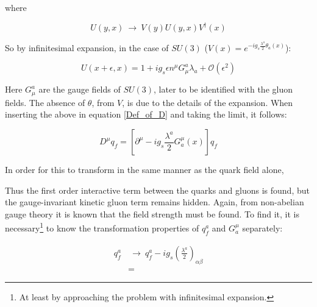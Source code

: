 \documentclass[11pt,a4paper]{article}
\begin{document}
where

\begin{equation}
	U(y,x) \:\rightarrow\: V(y)U(y,x)V^\dagger(x)
\end{equation}

So by infinitesimal expansion, in the case of $SU(3)$ ($V(x) = e^{-ig_s\frac{\lambda^a}{2}\theta_a(x)}$):

\begin{equation}
	U(x+\epsilon, x) = 1 + ig_s\epsilon n^\mu G_\mu^a \lambda_a + \mathcal{O}(\epsilon^2)
\end{equation}

Here $G_\mu^a$ are the gauge fields of $SU(3)$, later to be identified with the gluon fields. The absence of $\theta$, from $V$, is due to the details of the expansion. When inserting the above in equation \ref{Def_of_D} and taking the limit, it follows:

\begin{equation}
	D^\mu q_f = \left[ \partial^\mu - ig_s\frac{\lambda^a}{2}G_a^\mu(x) \right]q_f
\end{equation}

In order for this to transform in the same manner as the quark field alone,

Thus the first order interactive term between the quarks and gluons is found, but the gauge-invariant kinetic gluon term remains hidden. Again, from non-abelian gauge theory it is known that the field strength must be found. To find it, it is necessary\footnote{At least by approaching the problem with infinitesimal expansion.} to know the transformation properties of $q_f^a$ and $G_a^\mu$ separately:

\begin{align}
	q_f^a &\:\rightarrow\: q_f^a - ig_s\left(\frac{\lambda^a}{2}\right)_{\alpha\beta}\\
	&=
\end{align}
\end{document}
